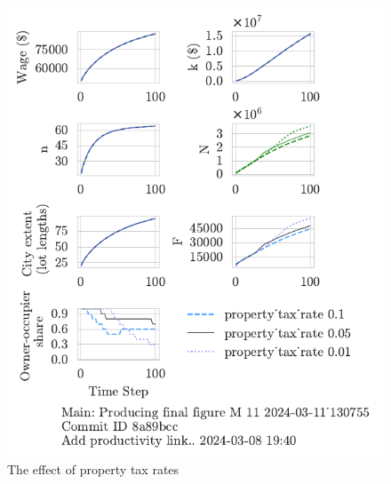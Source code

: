 \begin{figure}[h!tb]
    \centering
    \includegraphics[scale=.8, trim={0 1.4cm 0 0},clip]{fig/property_tax_rate-Main-130755.pdf}
    \caption{The effect of property tax rates}
    \label{fig:property_tax_ownership_trajectory}
\end{figure}

\newpage

